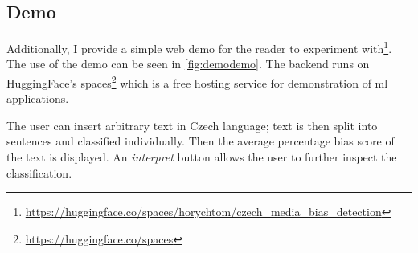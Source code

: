 \subsection{Demo}
Additionally, I provide a simple web demo for the reader to experiment with\footnote{\url{https://huggingface.co/spaces/horychtom/czech_media_bias_detection}}. The use of the demo can be seen in \ref{fig:demodemo}. The backend runs on HuggingFace's spaces\footnote{\url{https://huggingface.co/spaces}} which is a free hosting service for demonstration of \gls{ml} applications. 

The user can insert arbitrary text in Czech language; text is then split into sentences and classified individually. Then the average percentage bias score of the text is displayed. An \textit{interpret} button allows the user to further inspect the classification.

\begin{figure}
\end{figure}
